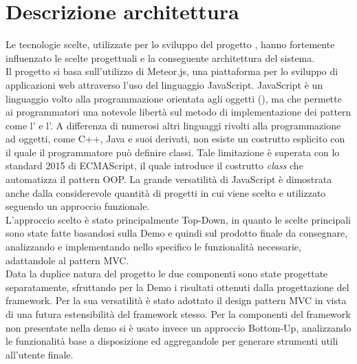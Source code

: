 \section{Descrizione architettura}
Le tecnologie scelte, utilizzate per lo sviluppo del progetto \ProjectName{}, hanno fortemente influenzato le scelte progettuali e la conseguente architettura del sistema.\\

Il progetto si basa sull'utilizzo di Meteor.js, una piattaforma per lo sviluppo di applicazioni web attraverso l'uso del linguaggio JavaScript. JavaScript è un linguaggio volto alla programmazione orientata agli oggetti (), ma che permette ai programmatori una notevole libertà sul metodo di implementazione dei pattern come l' e l'. A differenza di numerosi altri linguaggi rivolti alla programmazione ad oggetti, come C++, Java e suoi derivati, non esiste un costrutto esplicito con il quale il programmatore può definire classi. Tale limitazione è superata con lo standard 2015 di ECMAScript, il quale introduce il costrutto \textit{class} che automatizza il pattern OOP. La grande versatilità di JavaScript è dimostrata anche dalla considerevole quantità di progetti in cui viene scelto e utilizzato seguendo un approccio funzionale.\\

L'approccio scelto è stato principalmente Top-Down, in quanto le scelte principali sono state fatte basandosi sulla Demo e quindi sul prodotto finale da consegnare, analizzando e implementando nello specifico le funzionalità necessarie, adattandole al pattern MVC.\\

Data la duplice natura del progetto le due componenti sono state progettate separatamente, sfruttando per la Demo i risultati ottenuti dalla progettazione del framework. Per la sua versatilità è stato adottato il design pattern MVC in vista di una futura estensibilità del framework stesso. Per la componenti del framework non presentate nella demo si è usato invece un approccio Bottom-Up, analizzando le funzionalità base a disposizione ed aggregandole per generare strumenti utili all'utente finale.